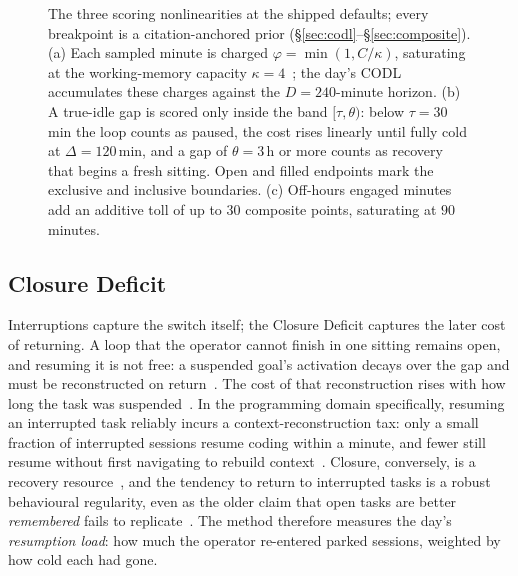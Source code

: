 \documentclass[10pt,twocolumn]{article}
\begin{document}
\begin{figure}[t]
\caption{The three scoring nonlinearities at the shipped defaults; every
breakpoint is a citation-anchored prior (\S\ref{sec:codl}--\S\ref{sec:composite}).
(a) Each sampled minute is charged $\varphi=\min(1,C/\kappa)$, saturating at the
working-memory capacity $\kappa=4$~\cite{cowan2001}; the day's CODL accumulates
these charges against the $D=240$-minute horizon.
(b) A true-idle gap is scored only inside the band $[\tau,\theta)$: below
$\tau=30$\,min the loop counts as paused, the cost rises linearly until fully
cold at $\Delta=120$\,min, and a gap of $\theta=3$\,h or more counts as recovery
that begins a fresh sitting. Open and filled endpoints mark the exclusive and
inclusive boundaries.
(c) Off-hours engaged minutes add an additive toll of up to $30$ composite
points, saturating at $90$ minutes.}
\label{fig:scoring}
\end{figure}

\subsection{Closure Deficit}\label{sec:closure}
Interruptions capture the switch itself; the Closure Deficit captures the later
cost of returning. A loop that the operator cannot finish in one sitting remains
open, and resuming it is not free: a suspended goal's activation decays over
the gap and must be reconstructed on return~\cite{altmann2002}. The cost of
that reconstruction rises with how long the task was suspended~\cite{monk2008}.
In the programming domain specifically, resuming an interrupted task reliably
incurs a context-reconstruction tax: only a small fraction of interrupted
sessions resume coding within a minute, and fewer still resume without first
navigating to rebuild context~\cite{parnin2011}. Closure, conversely, is a
recovery resource~\cite{sonnentag2007}, and the tendency to return to interrupted
tasks is a robust behavioural regularity, even as the older claim that open tasks
are better \emph{remembered} fails to replicate~\cite{ghibellini2025}. The
method therefore measures the day's \emph{resumption load}: how much the operator
re-entered parked sessions, weighted by how cold each had gone.
\end{document}
